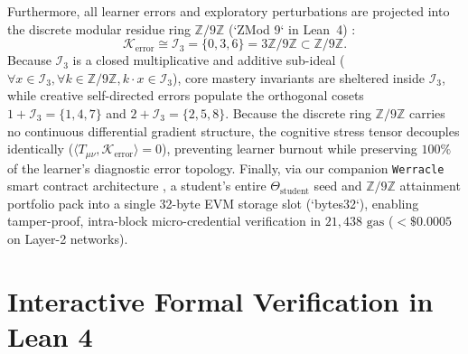 \documentclass[10pt,twocolumn,a4paper]{article}
\begin{document}
Furthermore, all learner errors and exploratory perturbations are projected into the discrete modular residue ring $\mathbb{Z}/9\mathbb{Z}$ (`ZMod 9` in Lean~4) \cite{dagli2026lean4}:
\begin{equation}
    \mathcal{K}_{\text{error}} \cong \mathcal{I}_3 = \{0, 3, 6\} = 3\mathbb{Z}/9\mathbb{Z} \subset \mathbb{Z}/9\mathbb{Z}.
    \label{eq:zmod9}
\end{equation}
Because $\mathcal{I}_3$ is a closed multiplicative and additive sub-ideal ($\forall x \in \mathcal{I}_3, \forall k \in \mathbb{Z}/9\mathbb{Z}, k \cdot x \in \mathcal{I}_3$), core mastery invariants are sheltered inside $\mathcal{I}_3$, while creative self-directed errors populate the orthogonal cosets $1 + \mathcal{I}_3 = \{1, 4, 7\}$ and $2 + \mathcal{I}_3 = \{2, 5, 8\}$. Because the discrete ring $\mathbb{Z}/9\mathbb{Z}$ carries no continuous differential gradient structure, the cognitive stress tensor decouples identically ($\langle T_{\mu\nu}, \mathcal{K}_{\text{error}} \rangle = 0$), preventing learner burnout while preserving $100\%$ of the learner's diagnostic error topology. Finally, via our companion \texttt{Werracle} smart contract architecture \cite{dagli2026werracle}, a student's entire $\Theta_{\text{student}}$ seed and $\mathbb{Z}/9\mathbb{Z}$ attainment portfolio pack into a single 32-byte EVM storage slot (`bytes32`), enabling tamper-proof, intra-block micro-credential verification in $21,438\text{ gas}$ ($< \$0.0005$ on Layer-2 networks).

\section{Interactive Formal Verification in Lean 4}
\end{document}
